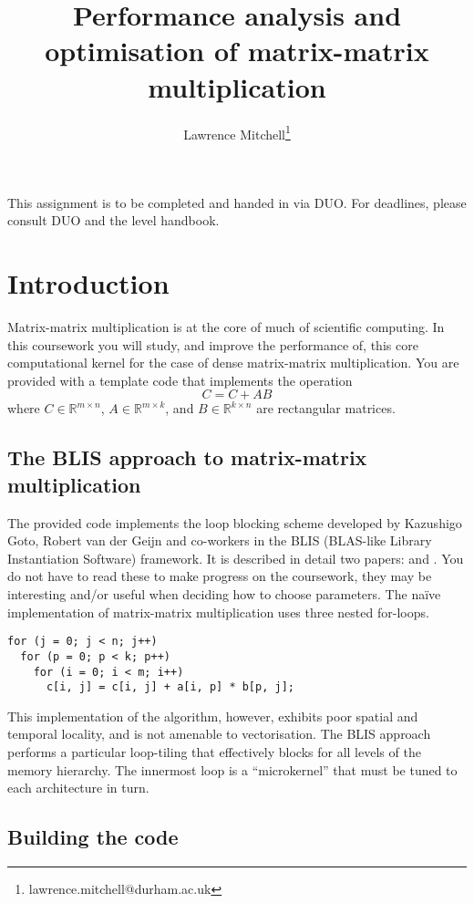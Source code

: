 \documentclass[a4paper]{article}
\title{Performance analysis and optimisation of matrix-matrix multiplication}
\author{Lawrence Mitchell\thanks{lawrence.mitchell@durham.ac.uk}}
\begin{document}
\maketitle

This assignment is to be completed and handed in via DUO. 
For deadlines, please consult DUO and the level handbook.

\section{Introduction}
\label{sec:introduction}
Matrix-matrix multiplication is at the core of much of scientific
computing. In this coursework you will study, and improve the
performance of, this core computational kernel for the case of dense
matrix-matrix multiplication. You are provided with a template code
that implements the operation
\begin{equation}
  \label{eq:1}
  C = C + A B
\end{equation}
where $C \in \mathbb{R}^{m \times n}$, $A \in \mathbb{R}^{m \times k}$,
and $B \in \mathbb{R}^{k \times n}$ are rectangular matrices.

\subsection{The BLIS approach to matrix-matrix multiplication}
\label{sec:blis}

The provided code implements the loop blocking scheme developed by
Kazushigo Goto, Robert van der Geijn and co-workers in the BLIS
(BLAS-like Library Instantiation Software) framework. It is described
in detail two papers: \textcite{Goto:2008} and \textcite{Zee:2015}.
You do not have to read these to make progress on the coursework, they
may be interesting and/or useful when deciding how to choose
parameters. The na{\"i}ve implementation of matrix-matrix
multiplication uses three nested for-loops.
\begin{verbatim}
for (j = 0; j < n; j++)
  for (p = 0; p < k; p++)
    for (i = 0; i < m; i++)
      c[i, j] = c[i, j] + a[i, p] * b[p, j];
\end{verbatim}
This implementation of the algorithm, however, exhibits poor spatial
and temporal locality, and is not amenable to vectorisation. The BLIS
approach performs a particular loop-tiling that effectively blocks for
all levels of the memory hierarchy. The innermost loop is a
``microkernel'' that must be tuned to each architecture in turn.


\subsection{Building the code}
\label{sec:build}
\end{document}

